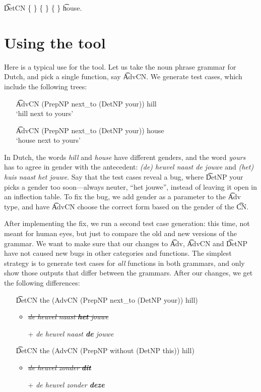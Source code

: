 \begin{EmptyItem}
\t{DetCN} \; \{
\} \; \{  \} \;
\{  \} \; \t{house}.
\end{EmptyItem}

\section{Using the tool}

Here is a typical use for the tool. Let us take the noun phrase
grammar for Dutch, and pick a single function, say \t{AdvCN}. We
generate test cases, which include the following trees:
\begin{itemize}
\item[] \t{AdvCN (PrepNP next\_to (DetNP your)) hill} \\
`hill next to yours'
\item[] \t{AdvCN (PrepNP next\_to (DetNP your)) house} \\ `house next
to yours'
\end{itemize}
In Dutch, the words \emph{hill} and \emph{house} have different
genders, and the word \emph{yours} has to agree in gender with the
antecedent: \emph{(de) heuvel naast de jouwe} and \emph{(het) huis
  naast het jouwe}. Say that the test cases reveal a bug, where
\t{DetNP your} picks a gender too soon---always neuter, ``het jouwe'',
instead of leaving it open in an inflection table. To fix the bug, we
add gender as a parameter to the \t{Adv} type, and have \t{AdvCN}
choose the correct form based on the gender of the \t{CN}.

After implementing the fix, we run a second test case generation: this
time, not meant for human eyes, but just to compare the old and new
versions of the grammar. We want to make sure that our changes to
\t{Adv}, \t{AdvCN} and \t{DetNP} have not caused new bugs in other
categories and functions. The simplest strategy is to generate test
cases for \emph{all} functions in both grammars, and only show those
outputs that differ between the grammars. After our changes, we get
the following differences:
\newpage
\begin{itemize}
\item[] \t{DetCN the (AdvCN (PrepNP next\_to (DetNP your)) hill)}
  \begin{itemize}
   \item \emph{\sout{de heuvel naast {\bf  het} jouwe}}
   \item[+] \emph{de heuvel naast {\bf  de} jouwe}
  \end{itemize}
\item[] \t{DetCN the (AdvCN (PrepNP without (DetNP this)) hill)}
  \begin{itemize}
   \item \emph{\sout{de heuvel zonder {\bf  dit}}}
   \item[+] \emph{de heuvel zonder {\bf  deze}}
  \end{itemize}
\end{itemize}

